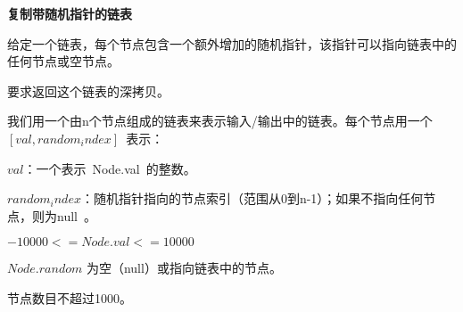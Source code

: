 \textbf{复制带随机指针的链表}\par

给定一个链表，每个节点包含一个额外增加的随机指针，该指针可以指向链表中的任何节点或空节点。\par

要求返回这个链表的深拷贝。 \par

我们用一个由n个节点组成的链表来表示输入/输出中的链表。每个节点用一个 $ [val, random_index] $ 表示：\par

$ val $：一个表示 Node.val 的整数。\par
$ random_index $：随机指针指向的节点索引（范围从0到n-1）；如果不指向任何节点，则为null 。\par

$ -10000 <= Node.val <= 10000 $\par

$ Node.random $ 为空（null）或指向链表中的节点。\par

节点数目不超过1000。\par
